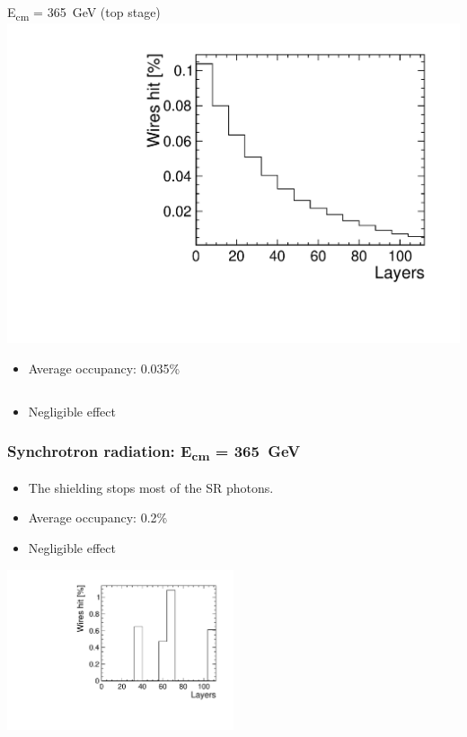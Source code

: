 \documentclass[hyperref={colorlinks=true,pdfpagelabels=false,linkcolor=black}, xcolor=dvipsnames,10pt]{beamer}
\begin{document}
\begin{frame}
\begin{columns}
    \begin{block}{E\textsubscript{cm} = 365~GeV (top stage)}
      \centering
      \includegraphics[width=\textwidth]{./figures/Hadrons_SL_Top.pdf}

      \begin{itemize}
        \item Average occupancy: 0.035\%
      \end{itemize}

    \end{block}
  \end{columns}

  \begin{itemize}
    \item Negligible effect
  \end{itemize}

\end{frame}

\begin{frame}
	\frametitle{Synchrotron radiation: E\textsubscript{cm} = 365~GeV}

  \begin{itemize}
    \item The shielding stops most of the SR photons.
    \item Average occupancy: 0.2\%
    \item Negligible effect
  \end{itemize}
  \centering
  \includegraphics[width=0.5\textwidth]{./figures/SR_SL.pdf}

\end{frame}
\end{document}
